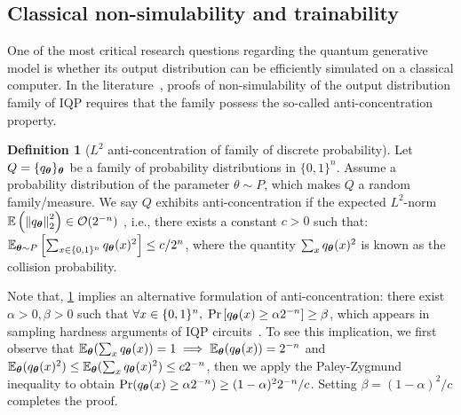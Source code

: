 \documentclass{article}
\theoremstyle{plain}
\theoremstyle{definition}
\newtheorem{definition}[theorem]{Definition}
\theoremstyle{remark}
\begin{document}
\subsection{Classical non-simulability and trainability}\label{subsec:non-simulability}
One of the most critical research questions regarding the quantum generative model is whether its output distribution can be efficiently simulated on a classical computer. In the literature~\cite{Bremner17}, proofs of non-simulability of the output distribution family of IQP requires that the family possess the so-called anti-concentration property.
\begin{definition}[$L^2$ anti-concentration of family of discrete probability]
\label{def:anti-concentration}
Let $Q = \{q_{\bm{\theta}}\}_{\bm{\theta}}$ be a family of probability distributions in $\{0,1\}^n$. Assume a probability distribution of the parameter $\theta \sim P$, which makes $Q$ a random family/measure. We say $Q$ exhibits anti-concentration if the expected $L^2$-norm $\mathbb{E}\left(\norm{q_{\bm{\theta}}}^2_2\right)\in\mathcal{O}(2^{-n})$ , i.e., there exists a constant $c>0$ such that: $\operatorname*{\mathbb{E}}_{{\bm{\theta}} \sim P}\left[\sum_{x\in\{0,1\}^n} q_{\bm{\theta}}(x)^2\right] \leq c/2^n$,
where the quantity $\sum_x q_{\bm{\theta}}(x)^2$ is known as the collision probability.  
\end{definition}
Note that, \cref{def:anti-concentration} implies an alternative formulation of anti-concentration: there exist $\alpha>0,\beta>0$ such that $\forall x\in \{0,1\}^n, \;\Pr\left[q_{\bm{\theta}}(x)\geq \alpha 2^{-n}\right]\ge \beta$,
which appears in sampling hardness arguments of IQP circuits~\cite{Bremner16, Bremner17}. To see this implication, we first observe that $\mathbb{E}_{\bm{\theta}}(\sum_xq_{\bm{\theta}}(x)) = 1\implies \mathbb{E}_{\bm{\theta}}(q_{\bm{\theta}}(x)) = 2^{-n}$ and $\mathbb{E}_{\bm{\theta}}(q_{\bm{\theta}}(x)^2) \le \mathbb{E}_{\bm{\theta}}(\sum_xq_{\bm{\theta}}(x)^2) \le c2^{-n}$, then we apply the Paley-Zygmund inequality to obtain $\Pr(q_{\bm{\theta}}(x) \ge \alpha2^{-n}) \ge (1-\alpha)^2 2^{-n}/c$. Setting $\beta = (1-\alpha)^2/c$ completes the proof.
\end{document}
